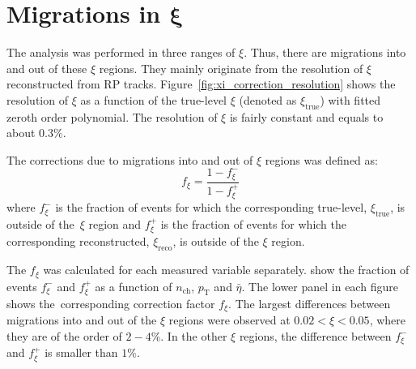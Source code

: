 \section[Migrations in $\xi$]{Migrations in $\mathbf{\xi}$}\label{section:star_xi}
The analysis was performed in three ranges of $\xi$. Thus, there are
migrations into and out of these $\xi$ regions. They mainly originate from the resolution of $\xi$ reconstructed from RP tracks. Figure~\ref{fig:xi_correction_resolution} shows the resolution of $\xi$ as a function of the true-level $\xi$ (denoted as $\xi_\textrm{true}$) with fitted zeroth order polynomial. The resolution of $\xi$ is fairly constant and equals to about $0.3\%$.


The corrections due to migrations into and out of  $\xi$ regions was defined as:
\begin{equation}
f_{\xi} = \frac{1-f_{\xi}^-}{1-f_{\xi}^+}
\end{equation}
where $f_{\xi}^-$ is the fraction of events for which the corresponding true-level, $\xi_\textrm{true}$, is outside of the~$\xi$ region and $f_{\xi}^+$  is the fraction of events for which the corresponding reconstructed, $\xi_\textrm{reco}$, is outside of the $\xi$ region.





The $f_{\xi}$ was calculated for each measured variable separately.  show the fraction of events $f_{\xi}^-$ and $f_{\xi}^+$ as a function of $n_\textrm{ch}$, $p_\textrm{T}$ and $\bar{\eta}$. The lower panel in each figure shows the~corresponding correction factor $f_\xi$. The largest differences between migrations into and out of the $\xi$ regions were observed at $0.02<\xi<0.05$, where they are of the order of $2-4\%$. In the other $\xi$ regions, the difference between $f_{\xi}^-$ and $f_{\xi}^+$  is smaller than $1\%$.


